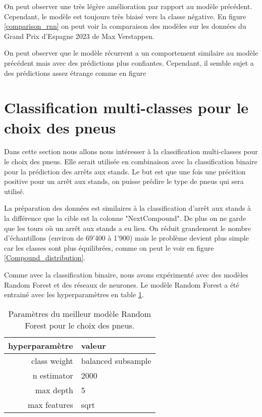 On peut observer une très légère amélioration par rapport au modèle précédent. Cependant, le modèle est toujours très biaisé vers la classe négative.
En figure \ref{comparison_rnn} on peut voir la comparaison des modèles sur les données du Grand Prix d'Espagne 2023 de Max Verstappen.

On peut observer que le modèle récurrent a un comportement similaire au modèle précédent mais avec des prédictions plus confiantes.
Cependant, il semble sujet a des prédictions assez étrange comme en figure %

\section{Classification multi-classes pour le choix des pneus}
Dans cette section nous allons nous intéresser à la classification multi-classes pour le choix des pneus.
Elle serait utilisée en combinaison avec la classification binaire pour la prédiction des arrêts aux stands.
Le but est que une fois une précition positive pour un arrêt aux stands, on puisse prédire le type de pneus qui sera utilisé.

La préparation des données est similaires à la classification d'arrêt aux stands à la différence que la cible est la colonne "NextCompound".
De plus on ne garde que les tours où un arrêt aux stands a eu lieu. On réduit grandement le nombre d'échantillons (environ de 69'400 à 1'900)
mais le problème devient plus simple car les classes sont plus équilibrées, comme on peut le voir en figure \ref{Compound_distribution}.

Comme avec la classification binaire, nous avons expérimenté avec des modèles Random Forest et des réseaux de neurones.
Le modèle Random Forest a été entrainé avec les hyperparamètres en table \ref{rf_hyperparameters_compound}.
\begin{table}[H]
    \begin{center}
        \caption{\label{rf_hyperparameters_compound}Paramètres du meilleur modèle Random Forest pour le choix des pneus.}
        \begin{tabular}{r|l}
            hyperparamètre & valeur             \\ \hline
            class weight   & balanced subsample \\
            n estimator    & 2000               \\
            max depth      & 5                  \\
            max features   & sqrt               \\
        \end{tabular}
    \end{center}
\end{table}

